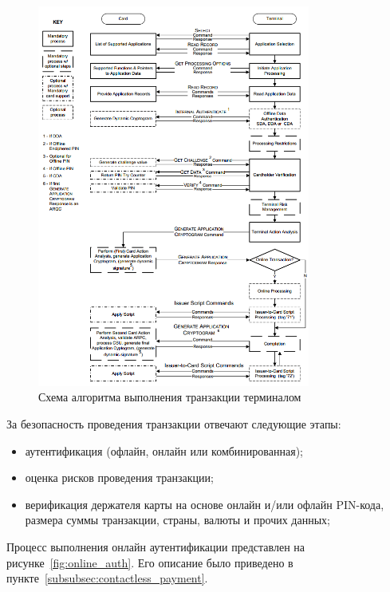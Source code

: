 \begin{figure}[H]
    \centering
    \includegraphics[width=0.8\textwidth]{images/research/transaction_flow_example}
    \caption{\centering Схема алгоритма выполнения транзакции терминалом}
    \label{fig:transaction_flow_example}
\end{figure}

За безопасность проведения транзакции отвечают следующие этапы:

\begin{itemize}
    \item аутентификация (офлайн, онлайн или комбинированная);
    \item оценка рисков проведения транзакции;
    \item верификация держателя карты на основе онлайн и/или офлайн PIN-кода, размера суммы транзакции, страны, валюты и прочих данных;
\end{itemize}


Процесс выполнения онлайн аутентификации представлен на рисунке~\ref{fig:online_auth}.
Его описание было приведено в пункте~\ref{subsubsec:contactless_payment}.

